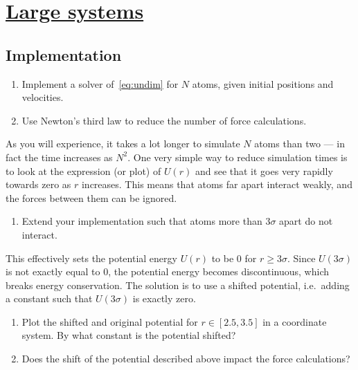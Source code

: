 \documentclass[11pt,british,a4paper]{report}
\begin{document}
\section{\underline{Large systems}}

\subsection{Implementation}
\begin{enumerate}[label=\roman*.]
    \item Implement a solver of~\vref{eq:undim} for \(N\) atoms, given initial positions and velocities.
    \item Use Newton's third law to reduce the number of force calculations.
\end{enumerate}

As you will experience, it takes a lot longer to simulate \(N\) atoms than two --- in fact the time increases as \(N^2\). One very simple way to reduce simulation times is to look at the expression (or plot) of \(U(r)\) and see that it goes very rapidly towards zero as \(r\) increases. This means that atoms far apart interact weakly, and the forces between them can be ignored.

\begin{enumerate}[label=\roman*., resume]
    \item Extend your implementation such that atoms more than \(3\sigma\) apart do not interact.
\end{enumerate}

This effectively sets the potential energy \(U(r)\) to be \(0\) for \(r\geq 3\sigma\). Since \(U(3\sigma)\) is not exactly equal to \(0\), the potential energy becomes discontinuous, which breaks energy conservation. The solution is to use a shifted potential, i.e.\ adding a constant such that \(U(3\sigma)\) is exactly zero.

\begin{enumerate}[label=\roman*., resume]
    \item Plot the shifted and original potential for $r\in[2.5, 3.5]$ in a coordinate system. By what constant is the potential shifted?
    \item Does the shift of the potential described above impact the force calculations?
\end{enumerate}
\end{document}
